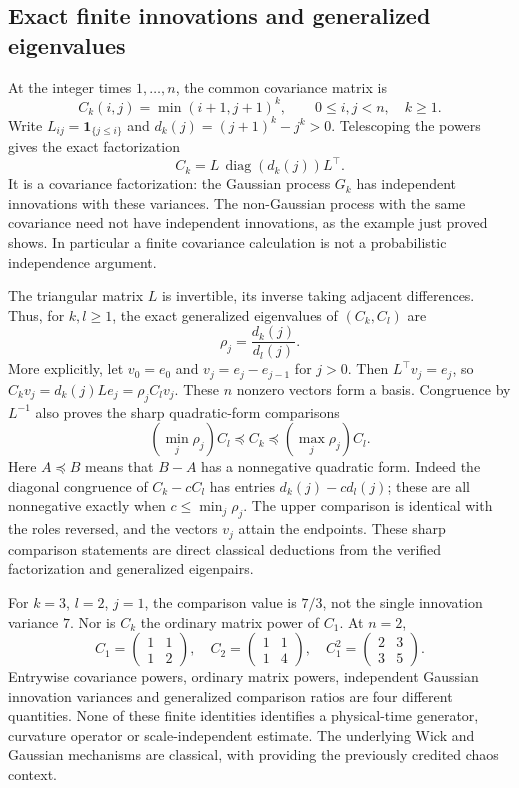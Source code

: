 \documentclass[11pt]{article}
\begin{document}
\subsection{Exact finite innovations and generalized eigenvalues}
At the integer times $1,\ldots,n$, the common covariance matrix is
\[
 C_k(i,j)=\min(i+1,j+1)^k,\qquad0\leq i,j<n,\quad k\geq1.
\]
Write $L_{ij}=\mathbf1_{\{j\leq i\}}$ and
$d_k(j)=(j+1)^k-j^k>0$. Telescoping the powers gives the exact
factorization
\[
 C_k=L\,\operatorname{diag}(d_k(j))L^\top.
\]
It is a covariance factorization: the Gaussian process $G_k$ has
independent innovations with these variances. The non-Gaussian
process with the same covariance need not have independent
innovations, as the example just proved shows. In particular a
finite covariance calculation is not a probabilistic independence
argument.

The triangular matrix $L$ is invertible, its inverse taking adjacent
differences. Thus, for $k,l\geq1$, the exact generalized eigenvalues
of $(C_k,C_l)$ are
\[
 \rho_j=\frac{d_k(j)}{d_l(j)}.
\]
More explicitly, let $v_0=e_0$ and $v_j=e_j-e_{j-1}$ for $j>0$.
Then $L^\top v_j=e_j$, so
$C_kv_j=d_k(j)Le_j=\rho_j C_lv_j$.
These $n$ nonzero vectors form a basis. Congruence by $L^{-1}$
also proves the sharp quadratic-form comparisons
\[
 \left(\min_j\rho_j\right)C_l\preceq C_k
 \preceq\left(\max_j\rho_j\right)C_l.
\]
Here $A\preceq B$ means that $B-A$ has a nonnegative quadratic
form. Indeed the diagonal congruence of $C_k-cC_l$ has entries
$d_k(j)-c d_l(j)$; these are all nonnegative exactly when
$c\leq\min_j\rho_j$. The upper comparison is identical with
the roles reversed, and the vectors $v_j$ attain the endpoints.
These sharp comparison statements are direct classical deductions
from the verified factorization and generalized eigenpairs.

For $k=3$, $l=2$, $j=1$, the comparison value is $7/3$, not the
single innovation variance $7$. Nor is $C_k$ the ordinary matrix
power of $C_1$. At $n=2$,
\[
 C_1=\begin{pmatrix}1&1\\1&2\end{pmatrix},\quad
 C_2=\begin{pmatrix}1&1\\1&4\end{pmatrix},\quad
 C_1^2=\begin{pmatrix}2&3\\3&5\end{pmatrix}.
\]
Entrywise covariance powers, ordinary matrix powers, independent
Gaussian innovation variances and generalized comparison ratios
are four different quantities. None of these finite identities
identifies a physical-time generator, curvature operator or
scale-independent estimate. The underlying Wick and Gaussian
mechanisms are classical, with \cite{Baudoin} providing the
previously credited chaos context.
\end{document}
